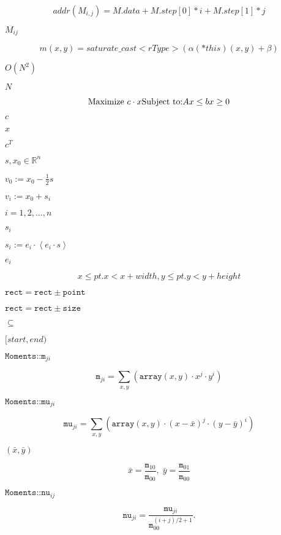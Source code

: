 \documentclass{article}
\begin{document}
\[addr(M_{i,j}) = M.data + M.step[0]*i + M.step[1]*j\]
\pagebreak

$M_{ij}$
\pagebreak

\[m(x,y) = saturate \_ cast<rType>( \alpha (*this)(x,y) + \beta )\]
\pagebreak

$O(N^2)$
\pagebreak

$N$
\pagebreak

\[\mbox{Maximize } c\cdot x\\ \mbox{Subject to:}\\ Ax\leq b\\ x\geq 0\]
\pagebreak

$c$
\pagebreak

$x$
\pagebreak

$c^T$
\pagebreak

$s,x_0\in\mathbb{R}^n$
\pagebreak

$v_0:=x_0-\frac{1}{2} s$
\pagebreak

$v_i:=x_0+s_i$
\pagebreak

$i=1,2,\dots,n$
\pagebreak

$s_i$
\pagebreak

$s_i:=e_i\cdot\left<e_i\cdot s\right>$
\pagebreak

$e_i$
\pagebreak

\[x \leq pt.x < x+width, y \leq pt.y < y+height\]
\pagebreak

$\texttt{rect} = \texttt{rect} \pm \texttt{point}$
\pagebreak

$\texttt{rect} = \texttt{rect} \pm \texttt{size}$
\pagebreak

$\subseteq$
\pagebreak

$[start,end)$
\pagebreak

$\texttt{Moments::m}_{ji}$
\pagebreak

\[\texttt{m} _{ji}= \sum _{x,y} \left ( \texttt{array} (x,y) \cdot x^j \cdot y^i \right )\]
\pagebreak

$\texttt{Moments::mu}_{ji}$
\pagebreak

\[\texttt{mu} _{ji}= \sum _{x,y} \left ( \texttt{array} (x,y) \cdot (x - \bar{x} )^j \cdot (y - \bar{y} )^i \right )\]
\pagebreak

$(\bar{x}, \bar{y})$
\pagebreak

\[\bar{x} = \frac{\texttt{m}_{10}}{\texttt{m}_{00}} , \; \bar{y} = \frac{\texttt{m}_{01}}{\texttt{m}_{00}}\]
\pagebreak

$\texttt{Moments::nu}_{ij}$
\pagebreak

\[\texttt{nu} _{ji}= \frac{\texttt{mu}_{ji}}{\texttt{m}_{00}^{(i+j)/2+1}} .\]
\pagebreak
\end{document}
